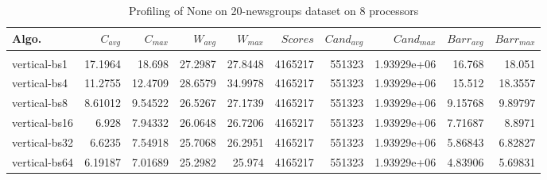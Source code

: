 \begin{table*}[htbp]
\centering
 \begin{tabular}{l r r r r r r r r r}
Algo. & $C_{avg}$ & $C_{max}$ & $W_{avg}$ & $W_{max}$ & $Scores$ & $Cand_{avg}$ & $Cand_{max}$ & $Barr_{avg}$ & $Barr_{max}$ \\
\hline \\
vertical-bs1 & 17.1964 & 18.698 & 27.2987 & 27.8448 & 4165217 & 551323 & 1.93929e+06 & 16.768 & 18.051 \\
vertical-bs4 & 11.2755 & 12.4709 & 28.6579 & 34.9978 & 4165217 & 551323 & 1.93929e+06 & 15.512 & 18.3557 \\
vertical-bs8 & 8.61012 & 9.54522 & 26.5267 & 27.1739 & 4165217 & 551323 & 1.93929e+06 & 9.15768 & 9.89797 \\
vertical-bs16 & 6.928 & 7.94332 & 26.0648 & 26.7206 & 4165217 & 551323 & 1.93929e+06 & 7.71687 & 8.8971 \\
vertical-bs32 & 6.6235 & 7.54918 & 25.7068 & 26.2951 & 4165217 & 551323 & 1.93929e+06 & 5.86843 & 6.82827 \\
vertical-bs64 & 6.19187 & 7.01689 & 25.2982 & 25.974 & 4165217 & 551323 & 1.93929e+06 & 4.83906 & 5.69831 \\
 
\end{tabular}
\caption{Profiling of None on 20-newsgroups dataset on 8 processors }
\label{tab:20-newsgroups:8}
\end{table*}
